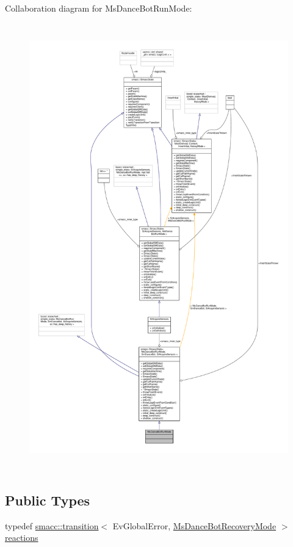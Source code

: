 Collaboration diagram for Ms\+Dance\+Bot\+Run\+Mode\+:
\nopagebreak
\begin{figure}[H]
\begin{center}
\leavevmode
\includegraphics[height=550pt]{classMsDanceBotRunMode__coll__graph}
\end{center}
\end{figure}
\subsection*{Public Types}
\begin{DoxyCompactItemize}
\item 
typedef \hyperlink{classsmacc_1_1transition}{smacc\+::transition}$<$ Ev\+Global\+Error, \hyperlink{classMsDanceBotRecoveryMode}{Ms\+Dance\+Bot\+Recovery\+Mode} $>$ \hyperlink{classMsDanceBotRunMode_af334e83af3357221ff972b9af50cad77}{reactions}
\end{DoxyCompactItemize}
